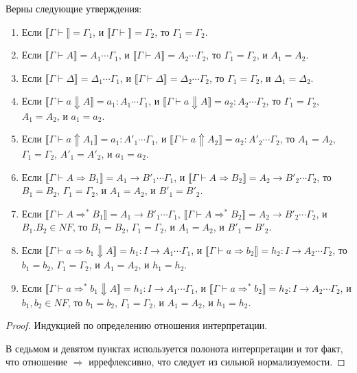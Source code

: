 \documentclass{amsart}
\theoremstyle{definition}
\theoremstyle{remark}
\newcommand{\red}{\Rightarrow}
\renewcommand{\ll}{\llbracket}
\newcommand{\rr}{\rrbracket}
\numberwithin{figure}{section}
\begin{document}
\begin{lem}
Верны следующие утверждения:
\begin{enumerate}
\item Если $\ll \Gamma \vdash \rr = \Gamma_1$, и $\ll \Gamma \vdash \rr = \Gamma_2$, то $\Gamma_1 = \Gamma_2$.
\item Если $\ll \Gamma \vdash A \rr = A_1 \dotsb \Gamma_1$, и $\ll \Gamma \vdash A \rr = A_2 \dotsb \Gamma_2$, то $\Gamma_1 = \Gamma_2$, и $A_1 = A_2$.
\item Если $\ll \Gamma \vdash \Delta \rr = \Delta_1 \dotsb \Gamma_1$, и $\ll \Gamma \vdash \Delta \rr = \Delta_2 \dotsb \Gamma_2$, то $\Gamma_1 = \Gamma_2$, и $\Delta_1 = \Delta_2$.
\item Если $\ll \Gamma \vdash a \Downarrow A \rr = a_1 : A_1 \dotsb \Gamma_1$, и $\ll \Gamma \vdash a \Downarrow A \rr = a_2 : A_2 \dotsb \Gamma_2$, то $\Gamma_1 = \Gamma_2$, $A_1 = A_2$, и $a_1 = a_2$.
\item Если $\ll \Gamma \vdash a \Uparrow A_1 \rr = a_1 : A'_1 \dotsb \Gamma_1$, и $\ll \Gamma \vdash a \Uparrow A_2 \rr = a_2 : A'_2 \dotsb \Gamma_2$, то $A_1 = A_2$, $\Gamma_1 = \Gamma_2$, $A'_1 = A'_2$, и $a_1 = a_2$.
\item Если $\ll \Gamma \vdash A \red B_1 \rr = A_1 \to B'_1 \dotsb \Gamma_1$, и $\ll \Gamma \vdash A \red B_2 \rr = A_2 \to B'_2 \dotsb \Gamma_2$, то $B_1 = B_2$, $\Gamma_1 = \Gamma_2$, и $A_1 = A_2$, и $B'_1 = B'_2$.
\item Если $\ll \Gamma \vdash A \red^* B_1 \rr = A_1 \to B'_1 \dotsb \Gamma_1$, $\ll \Gamma \vdash A \red^* B_2 \rr = A_2 \to B'_2 \dotsb \Gamma_2$, и $B_1. B_2 \in NF$, то $B_1 = B_2$, $\Gamma_1 = \Gamma_2$, и $A_1 = A_2$, и $B'_1 = B'_2$.
\item Если $\ll \Gamma \vdash a \red b_1 \Downarrow A \rr = h_1 : I \to A_1 \dotsb \Gamma_1$, и $\ll \Gamma \vdash a \red b_2 \rr = h_2 : I \to A_2 \dotsb \Gamma_2$, то $b_1 = b_2$, $\Gamma_1 = \Gamma_2$, и $A_1 = A_2$, и $h_1 = h_2$.
\item Если $\ll \Gamma \vdash a \red^* b_1 \Downarrow A \rr = h_1 : I \to A_1 \dotsb \Gamma_1$, и $\ll \Gamma \vdash a \red^* b_2 \rr = h_2 : I \to A_2 \dotsb \Gamma_2$, и $b_1, b_2 \in NF$, то $b_1 = b_2$, $\Gamma_1 = \Gamma_2$, и $A_1 = A_2$, и $h_1 = h_2$.
\end{enumerate}
\end{lem}
\begin{proof}
Индукцией по определению отношения интерпретации.

В седьмом и девятом пунктах используется полонота интерпретации и тот факт, что отношение $\red$ иррефлексивно, что следует из сильной нормализуемости.
\end{proof}
\end{document}
